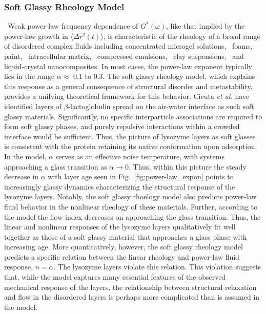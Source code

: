 \subsubsection{Soft Glassy Rheology Model}~Weak power-law frequency dependence of $G^*(\omega)$, like that implied by the power-law growth in $\langle \Delta r^2(t) \rangle$, is characteristic of the rheology of a broad range of disordered complex fluids including concentrated microgel solutions,~\cite{Ketz1988} foams,~\cite{Khan1988} paint,~\cite{Mackley1994} intracellular matrix,~\cite{Fabry2001} compressed emulsions,~\cite{Mason1995}  clay suspensions,~\cite{Bonn2002} and liquid-crystal nanocomposites. \cite{Bandyopadhyay2005}   In most cases, the power-law exponent typically lies in the range $\alpha \approx$ 0.1 to 0.3.  The soft glassy rheology model,\cite{Sollich1998} which explains this response as a general consequence of structural disorder and metastability, provides a unifying theoretical framework for this behavior.  Cicuta {\it et al.} have identified layers of $\beta$-lactoglobulin spread on the air-water interface as such soft glassy materials.\cite{Cicuta2003}  Significantly, no specific interparticle associations are required to form soft glassy phases, and purely repulsive interactions within a crowded interface would be sufficient.  Thus, the picture of lysozyme layers as soft glasses is consistent with the protein retaining its native conformation upon adsorption.  In the model, $\alpha$ serves as an effective noise temperature, with systems approaching a glass transition as $\alpha \rightarrow 0$.  Thus, within this picture the steady decrease in $\alpha$ with layer age seen in Fig.~\ref{fig:power-law_expon} points to increasingly glassy dynamics characterizing the structural response of the lysozyme layers.  Notably, the soft glassy rhoelogy model also predicts power-law fluid behavior in the nonlinear rheology of these materials.  Further, according to the model the flow index decreases on approaching the glass transition.  Thus, the linear and nonlinear responses of the lysozyme layers qualitatively fit well together as those of a soft glassy material that approaches a glass phase with increasing age.  More quantitatively, however, the soft glassy rheology model predicts a specific relation between the linear rheology and power-law fluid response,  $n = \alpha$.  The lysozyme layers violate this relation.  This violation suggests that, while the model captures many essential features of the observed mechanical response of the layers, the relationship between structural relaxation and flow in the disordered layers is perhaps more complicated than is assumed in the model.

